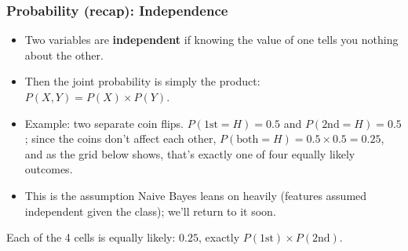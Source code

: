 \begin{frame}[fragile]\frametitle{Probability (recap): Independence}
\begin{itemize}
\item Two variables are \textbf{independent} if knowing the value of one tells you nothing about the other.
\item Then the joint probability is simply the product: $P(X,Y) = P(X)\times P(Y)$.
\item Example: two separate coin flips. $P(\text{1st}{=}H) = 0.5$ and $P(\text{2nd}{=}H)=0.5$; since the coins don't affect each other, $P(\text{both}{=}H) = 0.5\times0.5=0.25$, and as the grid below shows, that's exactly one of four equally likely outcomes.
\item This is the assumption Naive Bayes leans on heavily (features assumed independent given the class); we'll return to it soon.
\end{itemize}
\begin{center}

{\small Each of the 4 cells is equally likely: $0.25$, exactly $P(1\text{st})\times P(2\text{nd})$.}
\end{center}
\end{frame}

